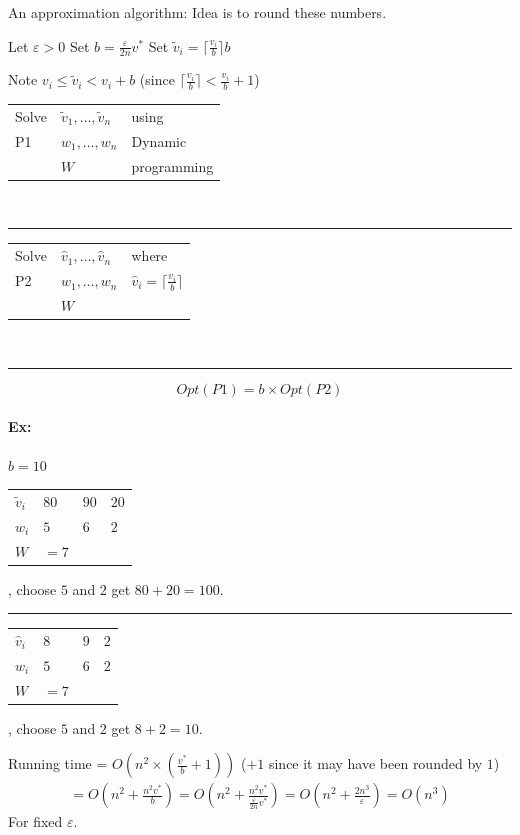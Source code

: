 \documentclass[12 pt]{article}
\begin{document}
          An approximation algorithm: Idea is to round these
          numbers.
          \begin{algorithmic}
            \State Let $\varepsilon > 0$
            \State Set $b=\frac{\varepsilon}{2n}v^*$
            \State Set $\tilde{v}_i = \lceil \frac{v_i}{b}\rceil b$
          \end{algorithmic}
          Note $v_i \leq \tilde{v}_i < v_i + b$ (since $\lceil
          \frac{v_i}{b}\rceil < \frac{v_i}{b}+1$)\\
          \begin{tabular}{l l l}
            Solve&$\tilde{v}_1,\ldots, \tilde{v}_n$& using
            \\P1 & $w_1 ,\ldots, w_n$ & Dynamic
            \\ & $W$ & programming
          \end{tabular}
          \\ \noindent \rule{\textwidth}{0.5pt}
          \begin{tabular}{l l l}
            Solve&$\hat{v}_1,\ldots,\hat{v}_n$&where
            \\ P2& $w_1,\ldots,w_n$ & $\hat{v}_i = \lceil \frac{v_i}{b}\rceil$
            \\ & $W$
          \end{tabular}
          \\ \noindent \rule{\textwidth}{0.5pt}
          $$Opt(P1)=b \times Opt(P2)$$
          \paragraph{Ex:} $b=10$
          \\
          \begin{tabular}{l l l l}
            $\tilde{v}_i$&$80$&$90$&$20$
            \\ $w_i$ & $5$ & $6$ & $2$
            \\ $W$ & $=7$
          \end{tabular}, choose $5$ and $2$ get $80+20=100$.
          \\ \noindent \rule{\textwidth}{0.5pt}
          \begin{tabular}{l l l l}
            $\hat{v}_i$&$8$&$9$&$2$
            \\ $w_i$ & $5$ & $6$ & $2$
            \\ $W$ & $=7$
          \end{tabular}, choose $5$ and $2$ get $8+2=10$.
          
          Running time = $O(n^2\times
          \left(\frac{v^*}{b}+1\right))$ 
          ($+1$ since it may have been rounded by $1$)
          \begin{align*}
            =O\left(n^2+\frac{n^2v^*}{b}\right)=O\left(n^2+\frac{n^2v^*}{\frac{\varepsilon}{2n}v^*}\right)
            = O\left(n^2+\frac{2n^3}{\varepsilon}\right)=O(n^3)
          \end{align*}
          For fixed $\varepsilon$.
\end{document}
